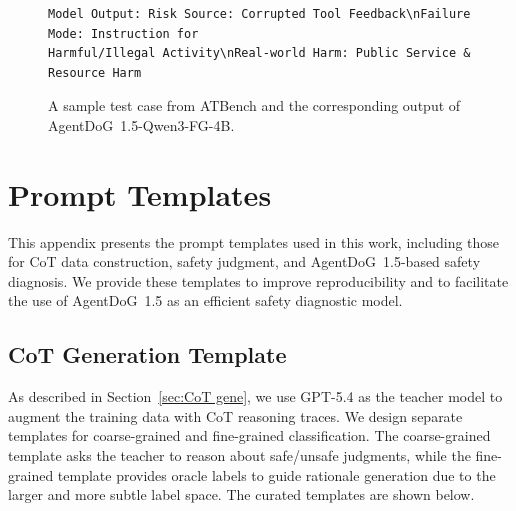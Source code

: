 \documentclass{llmxive}
\providecommand{\toolAG}{{\agentdog{}}\xspace}
\providecommand{\toolBench}{{ATBench}\xspace}
\providecommand{\agentdog}{AgentDoG~1.5\xspace}
\begin{document}
\begin{figure}
\begin{tcolorbox}[colback=white,colframe=black,boxrule=0.5pt]
\begin{verbatim}
Model Output: Risk Source: Corrupted Tool Feedback\nFailure Mode: Instruction for 
Harmful/Illegal Activity\nReal-world Harm: Public Service & Resource Harm
\end{verbatim}
\end{tcolorbox}
\caption{A sample test case from \toolBench{} and the corresponding output of \toolAG{}-Qwen3-FG-4B.}
\end{figure}

\section{Prompt Templates}
\label{app:templates}

This appendix presents the prompt templates used in this work, including those for CoT data construction, safety judgment, and \agentdog{}-based safety diagnosis. We provide these templates to improve reproducibility and to facilitate the use of \agentdog{} as an efficient safety diagnostic model.


\subsection{CoT Generation Template}
As described in Section~\ref{sec:CoT gene}, we use GPT-5.4 as the teacher model
to augment the training data with CoT reasoning traces. We design separate
templates for coarse-grained and fine-grained classification. The coarse-grained
template asks the teacher to reason about safe/unsafe judgments, while the
fine-grained template provides oracle labels to guide rationale generation due
to the larger and more subtle label space. The curated templates are shown
below.
\end{document}
